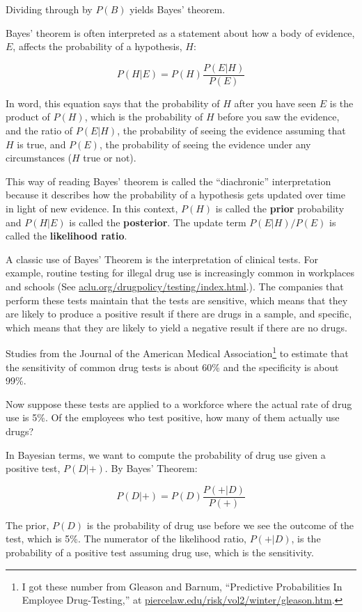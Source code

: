 \documentclass[10pt]{book}
\begin{document}
Dividing through by $P(B)$ yields Bayes' theorem.

Bayes' theorem is often interpreted as a statement about 
how a body of evidence, $E$, affects the probability of a 
hypothesis, $H$:

\[ P(H|E) = P(H) \frac{P(E|H)}{P(E)} \]

In word, this equation says that the probability of $H$
after you have seen $E$ is the product of $P(H)$, which
is the probability of $H$ before you saw the evidence,
and the ratio of $P(E|H)$, the probability of seeing the
evidence assuming that $H$ is true, and 
$P(E)$, the probability of seeing the evidence under
any circumstances ($H$ true or not).

This way of reading Bayes' theorem is called the ``diachronic''
interpretation because it describes how the probability
of a hypothesis gets updated over time in light of
new evidence.  In this context, $P(H)$ is called the
{\bf prior} probability and $P(H|E)$ is called the
{\bf posterior}.  The update term $P(E|H)/P(E)$ is called
the {\bf likelihood ratio}.

A classic use of Bayes' Theorem is the interpretation of clinical
tests.  For example, routine testing for illegal drug use is
increasingly common in workplaces and schools (See
\url{aclu.org/drugpolicy/testing/index.html}.).  The companies that
perform these tests maintain that the tests are
sensitive, which means that they are likely to produce a positive
result if there are drugs in a sample, and specific, which
means that they are likely to yield a negative result if
there are no drugs.

Studies from the Journal of the American Medical
Association\footnote{I got these number from Gleason and Barnum,
  ``Predictive Probabilities In Employee Drug-Testing,'' at
  \url{piercelaw.edu/risk/vol2/winter/gleason.htm}.} to estimate that
the sensitivity of common drug tests is about 60\% and the specificity
is about 99\%.

Now suppose these tests are applied to a workforce where the
actual rate of drug use is 5\%.  Of the employees who test positive,
how many of them actually use drugs?

In Bayesian terms, we want to compute the probability of
drug use given a positive test, $P(D|+)$.  By Bayes' Theorem:

\[ P(D|+) = P(D) \frac{P(+|D)}{P(+)} \]

The prior, $P(D)$ is the probability of drug use before we
see the outcome of the test, which is 5\%.
The numerator of the likelihood ratio, $P(+|D)$, is the probability
of a positive test assuming drug use, which is the sensitivity.
\end{document}
